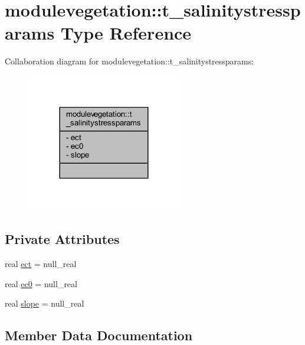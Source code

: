 \hypertarget{structmodulevegetation_1_1t__salinitystressparams}{}\section{modulevegetation\+:\+:t\+\_\+salinitystressparams Type Reference}
\label{structmodulevegetation_1_1t__salinitystressparams}


Collaboration diagram for modulevegetation\+:\+:t\+\_\+salinitystressparams\+:\nopagebreak
\begin{figure}[H]
\begin{center}
\leavevmode
\includegraphics[width=192pt]{structmodulevegetation_1_1t__salinitystressparams__coll__graph}
\end{center}
\end{figure}
\subsection*{Private Attributes}
\begin{DoxyCompactItemize}
\item 
real \mbox{\hyperlink{structmodulevegetation_1_1t__salinitystressparams_a048985129781a13671d115642791cdb0}{ect}} = null\+\_\+real
\item 
real \mbox{\hyperlink{structmodulevegetation_1_1t__salinitystressparams_adf1b6835fb4fe82dee9db3e2cec95356}{ec0}} = null\+\_\+real
\item 
real \mbox{\hyperlink{structmodulevegetation_1_1t__salinitystressparams_a22e89ec29b26108e08c2fcda2125c70e}{slope}} = null\+\_\+real
\end{DoxyCompactItemize}


\subsection{Member Data Documentation}
\mbox{\label{structmodulevegetation_1_1t__salinitystressparams_adf1b6835fb4fe82dee9db3e2cec95356}} 
